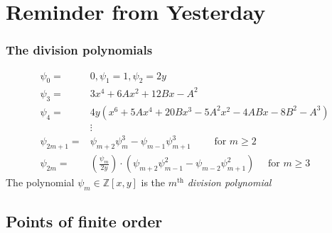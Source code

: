 \documentclass[12pt,handout]{beamer} %
\theoremstyle{definition}
\begin{document}
\section{Reminder from Yesterday}


\begin{frame}\frametitle{The division polynomials}

\begin{Definition}[Division Polynomials of $E:y^2=x^3+Ax+B$ ($p>3$)]\vspace*{-0.7cm}
\begin{align*}
        \psi_{0} =& 0,
        \psi_{1} = 1,
        \psi_{2} = 2y\\
        \psi_{3} =& 3x^{4} + 6Ax^{2} + 12Bx - A^{2}\\
        \psi_{4} =& 4y(x^{6} + 5Ax^{4} + 20Bx^{3} - 5A^{2}x^{2} - 4ABx - 8B^{2} - A^{3}) \\
        &\vdots\\
        \psi_{2m+1} =& \psi_{m+2}\psi_{m}^{3}-\psi_{m-1}\psi^{3}_{m+1} \qquad \text{ for } m \geq 2\\
        \psi_{2m}  =& \left(\frac{\psi_{m}}{2y}\right)\cdot(\psi_{m+2}\psi^{2}_{m-1}-\psi_{m-2}\psi^{2}_{m+1}) \quad \text{ for } m \geq 3
\end{align*}
The polynomial $\psi_m\in{\mathbb Z}[x,y]$ is the $m^{\text{th}}$ \emph{division polynomial}
\end{Definition}\pause
{}
\end{frame}

\subsection{Points of finite order}
\end{document}

